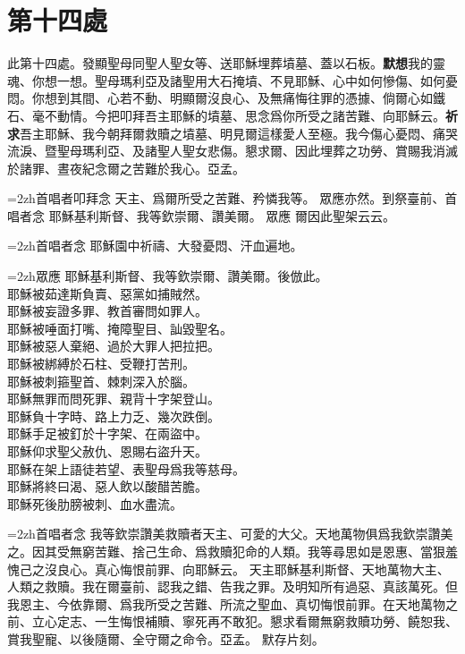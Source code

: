 \section*{第十四處}
此第十四處。發顯聖母同聖人聖女等、送耶穌埋葬墳墓、蓋以石板。\cspace\textbf{默想}我的靈魂、你想一想。聖母瑪利亞及諸聖用大石掩墳、不見耶穌、心中如何慘傷、如何憂悶。你想到其間、心若不動、明顯爾沒良心、及無痛悔往罪的憑據、倘爾心如鐵石、毫不動情。今把叩拜吾主耶穌的墳墓、思念爲你所受之諸苦難、向耶穌云。\cspace\textbf{祈求}吾主耶穌、我今朝拜爾救贖之墳墓、明見爾這樣愛人至極。我今傷心憂悶、痛哭流淚、暨聖母瑪利亞、及諸聖人聖女悲傷。懇求爾、因此埋葬之功勞、賞賜我消滅於諸罪、晝夜紀念爾之苦難於我心。{\cspace}亞孟。

\hangindent=2zh{\small 首唱者叩拜念} 天主、爲爾所受之苦難、矜憐我等。 {\small 眾應亦然。到祭臺前、首唱者念} 耶穌基利斯督、我等欽崇爾、讚美爾。  {\small 眾應} 爾因此聖架{\small 云云}。

\hangindent=2zh{\small 首唱者念} 耶穌園中祈禱、大發憂悶、汗血遍地。

\hangindent=2zh{\small 眾應} 耶穌基利斯督、我等欽崇爾、讚美爾。{\small 後倣此。}\\
耶穌被茹達斯負賣、惡黨如捕賊然。\\
耶穌被妄證多罪、教首審問如罪人。\\
耶穌被唾面打嘴、掩障聖目、訕毀聖名。\\
耶穌被惡人棄絕、過於大罪人把拉把。\\
耶穌被綁縛於石柱、受鞭打苦刑。\\
耶穌被刺箍聖首、棘刺深入於腦。\\
耶穌無罪而問死罪、親背十字架登山。\\
耶穌負十字時、路上力乏、幾次跌倒。\\
耶穌手足被釘於十字架、在兩盜中。\\
耶穌仰求聖父赦仇、恩賜右盜升天。\\
耶穌在架上語徒若望、表聖母爲我等慈母。\\
耶穌將終曰渴、惡人飲以酸醋苦膽。\\
耶穌死後肋膀被刺、血水盡流。

\hangindent=2zh{\small 首唱者念} 我等欽崇讚美救贖者天主、可愛的大父。天地萬物俱爲我欽崇讚美之。因其受無窮苦難、捨己生命、爲救贖犯命的人類。我等尋思如是恩惠、當狠羞愧己之沒良心。真心悔恨前罪、向耶穌云。 天主耶穌基利斯督、天地萬物大主、人類之救贖。我在爾臺前、認我之錯、告我之罪。及明知所有過惡、真該萬死。但我恩主、今依靠爾、爲我所受之苦難、所流之聖血、真切悔恨前罪。在天地萬物之前、立心定志、一生悔恨補贖、寧死再不敢犯。懇求看爾無窮救贖功勞、饒恕我、賞我聖寵、以後隨爾、全守爾之命令。{\cspace}亞孟。 {\small 默存片刻。}

